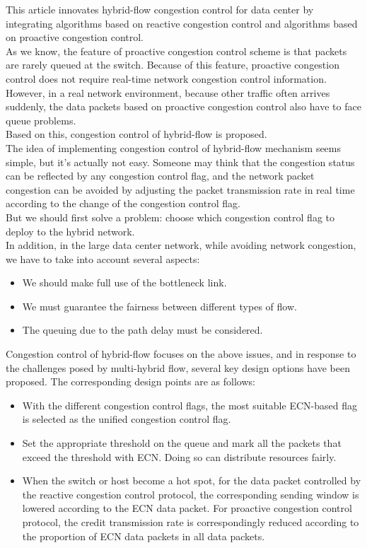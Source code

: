 \documentclass[conference]{IEEEtran}
\begin{document}
\indent This article innovates hybrid-flow congestion control for data center by integrating algorithms based on reactive congestion control and algorithms based on proactive congestion control.\\
\indent As we know, the feature of proactive congestion control scheme is that packets are rarely queued at the switch. Because of this feature, proactive congestion control does not require real-time network congestion control information. However, in a real network environment, because other traffic often arrives suddenly, the data packets based on proactive congestion control also have to face queue problems.\\
Based on this, congestion control of hybrid-flow is proposed.\\
\indent The idea of implementing congestion control of hybrid-flow mechanism seems simple, but it's actually not easy. Someone may think that the congestion status can be reflected by any congestion control flag, and the network packet congestion can be avoided by adjusting the packet transmission rate in real time according to the change of the congestion control flag.\\
But we should first solve a problem: choose which congestion control flag to deploy to the hybrid network.\\
\indent In addition, in the large data center network, while avoiding network congestion, we have to take into account several aspects:
\begin{itemize}
\item We should make full use of the bottleneck link.
\item We must guarantee the fairness between different types of flow.
\item The queuing due to the path delay must be considered.
\end{itemize}
\indent Congestion control of hybrid-flow focuses on the above issues, and in response to the challenges posed by multi-hybrid flow, several key design options have been proposed. The corresponding design points are as follows:
\begin{itemize}
\item With the different congestion control flags, the most suitable ECN-based flag is selected as the unified congestion control flag.
\item Set the appropriate threshold on the queue and mark all the packets that exceed the threshold with ECN. Doing so can distribute resources fairly.
\item When the switch or host become a hot spot, for the data packet controlled by the reactive congestion control protocol, the corresponding sending window is lowered according to the ECN data packet. For proactive congestion control protocol, the credit transmission rate is correspondingly reduced according to the proportion of ECN data packets in all data packets.
\end{itemize}
\end{document}
